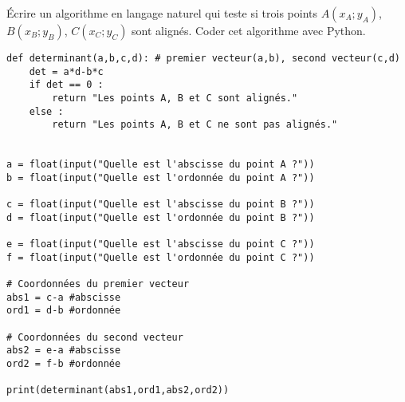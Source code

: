  
Écrire un algorithme en langage naturel qui teste si trois points $A(x_A;y_A)$, $B(x_B;y_B)$, $C(x_C;y_C)$ sont alignés. Coder cet algorithme avec Python.

\begin{verbatim}
def determinant(a,b,c,d): # premier vecteur(a,b), second vecteur(c,d)
    det = a*d-b*c
    if det == 0 :
        return "Les points A, B et C sont alignés."
    else :
        return "Les points A, B et C ne sont pas alignés."  


a = float(input("Quelle est l'abscisse du point A ?"))
b = float(input("Quelle est l'ordonnée du point A ?"))

c = float(input("Quelle est l'abscisse du point B ?"))
d = float(input("Quelle est l'ordonnée du point B ?"))

e = float(input("Quelle est l'abscisse du point C ?"))
f = float(input("Quelle est l'ordonnée du point C ?"))

# Coordonnées du premier vecteur
abs1 = c-a #abscisse
ord1 = d-b #ordonnée

# Coordonnées du second vecteur
abs2 = e-a #abscisse
ord2 = f-b #ordonnée

print(determinant(abs1,ord1,abs2,ord2))
\end{verbatim}